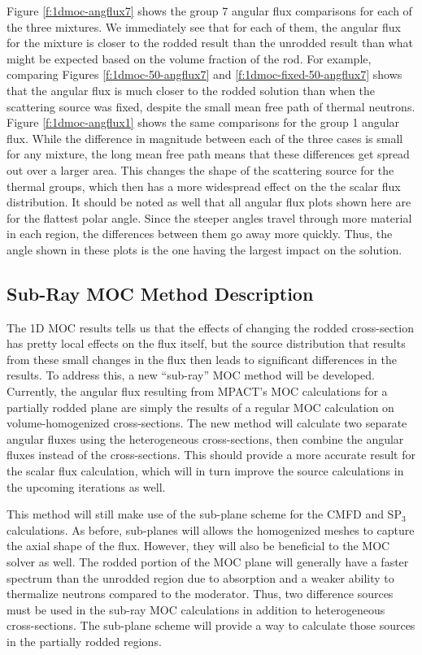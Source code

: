 Figure \ref{f:1dmoc-angflux7} shows the group 7 angular flux comparisons for each of the three mixtures.  We immediately see that for each of them, the angular flux for the mixture is closer to the rodded result than the unrodded result than what might be expected based on the volume fraction of the rod.  For example, comparing Figures \ref{f:1dmoc-50-angflux7} and \ref{f:1dmoc-fixed-50-angflux7} shows that the angular flux is much closer to the rodded solution than when the scattering source was fixed, despite the small mean free path of thermal neutrons.  Figure \ref{f:1dmoc-angflux1} shows the same comparisons for the group 1 angular flux.  While the difference in magnitude between each of the three cases is small for any mixture, the long mean free path means that these differences get spread out over a larger area.  This changes the shape of the scattering source for the thermal groups, which then has a more widespread effect on the the scalar flux distribution.  It should be noted as well that all angular flux plots shown here are for the flattest polar angle.  Since the steeper angles travel through more material in each region, the differences between them go away more quickly.  Thus, the angle shown in these plots is the one having the largest impact on the solution.
\subsection{Sub-Ray MOC Method Description}

The 1D MOC results tells us that the effects of changing the rodded cross-section has pretty local effects on the flux itself, but the source distribution that results from these small changes in the flux then leads to significant differences in the results.  To address this, a new ``sub-ray'' MOC method will be developed.  Currently, the angular flux resulting from MPACT's MOC calculations for a partially rodded plane are simply the results of a regular MOC calculation on volume-homogenized cross-sections.  The new method will calculate two separate angular fluxes using the heterogeneous cross-sections, then combine the angular fluxes instead of the cross-sections.  This should provide a more accurate result for the scalar flux calculation, which will in turn improve the source calculations in the upcoming iterations as well.

This method will still make use of the sub-plane scheme for the CMFD and SP$_3$ calculations.  As before, sub-planes will allows the homogenized meshes to capture the axial shape of the flux.  However, they will also be beneficial to the MOC solver as well.  The rodded portion of the MOC plane will generally have a faster spectrum than the unrodded region due to absorption and a weaker ability to thermalize neutrons compared to the moderator.  Thus, two difference sources must be used in the sub-ray MOC calculations in addition to heterogeneous cross-sections.  The sub-plane scheme will provide a way to calculate those sources in the partially rodded regions.

